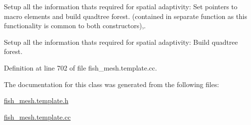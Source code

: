 Setup all the information that\textquotesingle{}s required for spatial adaptivity\+: Set pointers to macro elements and build quadtree forest. (contained in separate function as this functionality is common to both constructors),. 

Setup all the information that\textquotesingle{}s required for spatial adaptivity\+: Build quadtree forest. 

Definition at line 702 of file fish\+\_\+mesh.\+template.\+cc.



The documentation for this class was generated from the following files\+:\begin{DoxyCompactItemize}
\item 
\hyperlink{fish__mesh_8template_8h}{fish\+\_\+mesh.\+template.\+h}\item 
\hyperlink{fish__mesh_8template_8cc}{fish\+\_\+mesh.\+template.\+cc}\end{DoxyCompactItemize}
